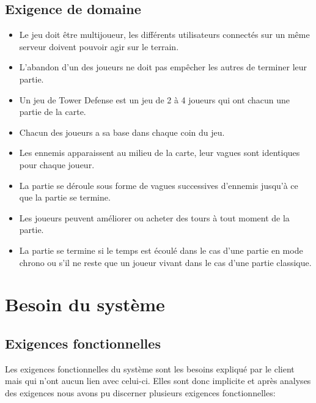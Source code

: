 \documentclass[12pt,a4paper]{article}
\begin{document}
\subsection{Exigence de domaine}

\begin{itemize}
	\item Le jeu doit être multijoueur, les différents \glspl{utilisateur} connectés sur un même \gls{serveur} doivent pouvoir agir sur le terrain.
   \item  L'abandon d'un des \glspl{joueur} ne doit pas empêcher les autres de terminer leur partie. 
   \item Un jeu de \gls{Tower Defense} est un jeu de 2 à 4 \glspl{joueur} qui ont chacun une partie de la carte.
   \item Chacun des \glspl{joueur} a sa base dans chaque coin du jeu.
   \item Les \glspl{ennemi} apparaissent au milieu de la carte, leur vagues sont identiques pour chaque \gls{joueur}.
   \item La partie se déroule sous forme de vagues successives d’\glspl{ennemi} jusqu’à ce que la partie se termine.
   \item  Les \glspl{joueur} peuvent améliorer ou acheter des tours à tout moment de la partie.
   \item  La partie se termine si le temps est écoulé dans le cas d’une partie en mode chrono ou s’il ne reste que un \gls{joueur} vivant dans le cas d’une partie classique.
\end{itemize}
\newpage
\section{Besoin du système}
\subsection{Exigences fonctionnelles}
Les exigences fonctionnelles du système sont les besoins expliqué par le client  mais qui n'ont aucun lien avec celui-ci. Elles sont donc implicite et après analyses des exigences nous avons pu discerner plusieurs exigences fonctionnelles: \\
\end{document}
